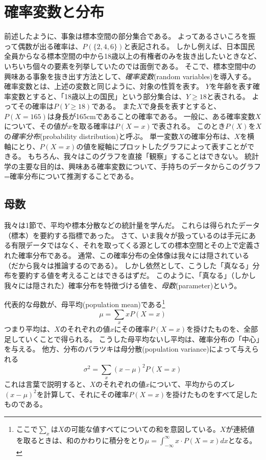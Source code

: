 \documentclass{jsarticle}
\begin{document}
\section{確率変数と分布}
前述したように、事象は標本空間の部分集合である。
よってあるさいころを振って偶数が出る確率は、$P(\{2, 4, 6\})$と表記される。
しかし例えば、日本国民全員からなる標本空間の中から18歳以上の有権者のみを抜き出したいときなど、いちいち個々の要素を列挙していたのでは面倒である。	
そこで、標本空間中の興味ある事象を抜き出す方法として、\emph{確率変数}(random variables)を導入する。
確率変数とは、上述の変数と同じように、対象の性質を表す。%
$Y$を年齢を表す確率変数とすると、「18歳以上の国民」という部分集合は、$Y \geq 18$と表される。
よってその確率は$P(Y \geq 18)$である。
また$X$で身長を表すとすると、$P(X = 165)$は身長が165cmであることの確率である。
一般に、ある確率変数$X$について、その値が$x$を取る確率は$P(X=x)$で表される。
このとき$P(X)$を$X$の\emph{確率分布}(probability distribution)と呼ぶ。
単一変数$X$の確率分布は、$X$を横軸にとり、$P(X=x)$の値を縦軸にプロットしたグラフによって表すことができる。%
もちろん、我々はこのグラフを直接「観察」することはできない。
統計学の主要な目的は、興味ある確率変数について、手持ちのデータからこのグラフ=確率分布について推測することである。

\subsection{母数}
我々は1節で、平均や標本分散などの統計量を学んだ。
これらは得られたデータ（標本）を要約する指標であった。
さて、いま我々が扱っているのは手元にある有限データではなく、それを取ってくる源としての標本空間とその上で定義された確率分布である。
通常、この確率分布の全体像は我々には隠されている（だから我々は推論するのである）。
しかし依然として、こうした「真なる」分布を要約する値を考えることはできるはずだ。
このように、「真なる」（しかし我々には隠された）確率分布を特徴づける値を、\emph{母数}(parameter)という。

代表的な母数が、母平均(population mean)である\footnote{ここで$\sum_{x}$は$X$の可能な値すべてについての和を意図している。$X$が連続値を取るときは、和のかわりに積分をとり$\mu = \int^{\infty}_{-\infty} x \cdot P(X=x) dx$となる。}
\[
 \mu = \sum_{x} x P(X=x) 
\]
つまり平均は、$X$のそれぞれの値$x$にその確率$P(X=x)$を掛けたものを、全部足していくことで得られる。
こうした母平均ないし平均は、確率分布の「中心」を与える。
他方、分布のバラツキは母分散(population variance)によって与えられる
\[
 \sigma^2 = \sum_{x} (x - \mu)^2 P(X=x) 
\]
これは言葉で説明すると、$X$のそれぞれの値$x$について、平均からのズレ$(x-\mu)^2$を計算して、それにその確率$P(X=x)$を掛けたものをすべて足したものである。
\end{document}
